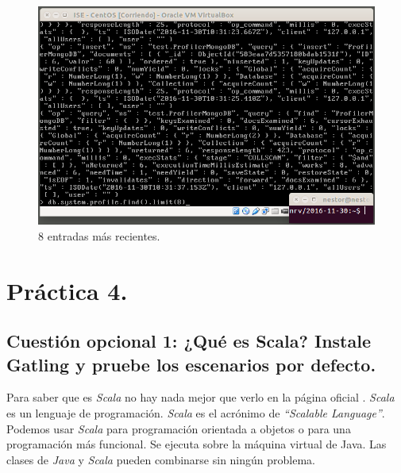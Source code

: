 \documentclass[a4paper,titlepage,12pt]{report}	%
\numberwithin{figure}{section} %
\numberwithin{table}{section} %
\begin{document}
	\begin{figure}[H]
	   \includegraphics[width=\linewidth]{./Imagenes/P3/O11-4.png}
	   \vspace{-0.5cm}
	   \caption[8 entradas más recientes.]{8 entradas más recientes.}
	   \label{P3-O11-4}
	\end{figure}
	
	\chapter[Práctica 4.]{Práctica 4.}

	\section[Cuestión opcional 1: ¿Qué es Scala? Instale Gatling y pruebe los escenarios por defecto.]{Cuestión opcional 1: ¿Qué es Scala? Instale Gatling y pruebe los escenarios por defecto.}
		
	Para saber que es \textit{Scala} no hay nada mejor que verlo en la página oficial \cite{scala}. \textit{Scala} es un lenguaje de programación. \textit{Scala} es el acrónimo de \textit{``Scalable Language''}. Podemos usar \textit{Scala} para programación orientada a objetos o para una programación más funcional. Se ejecuta sobre la máquina virtual de Java. Las clases de \textit{Java} y \textit{Scala} pueden combinarse sin ningún problema. \\
	
\end{document}
